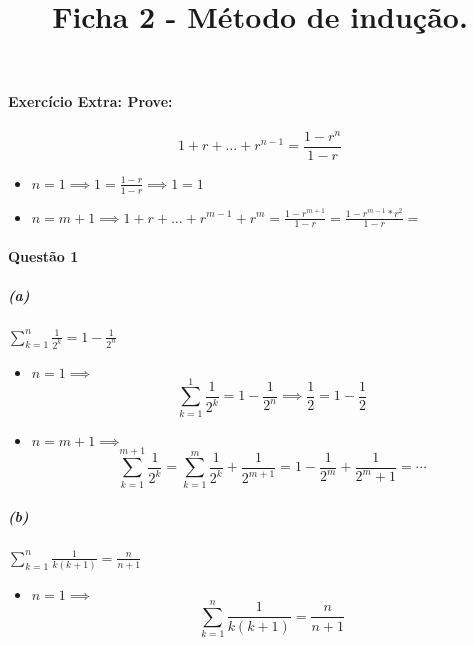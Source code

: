 \documentclass[12pt]{report}
\begin{document}
\title{Ficha 2 - Método de indução.}
\author{}
\date{}

\maketitle

\paragraph{Exercício Extra: Prove: }
$$ 1+r+\dots + r^{n-1}=\frac{1-r^n}{1-r} $$
\begin{itemize}
\item $ n=1\implies 1=\frac{1-r}{1-r} \implies 1=1 $
\item $ n=m+1 \implies 1+r+\dots +r^{m-1}+r^m =\frac{1-r^{m+1}}{1-r}=\frac{1-r^{m-1}*r^2}{1-r}=\frac{}{} $ 
\end{itemize}

\paragraph{Questão 1}
\subparagraph{(a)} $ \sum_{k=1}^{n}{\frac{1}{2^k}} = 1 - \frac{1}{2^n}  $
\begin{itemize}

	\item $ n=1 \implies $	
	$$ \sum_{k=1}^{1}{\frac{1}{2^k}} = 1- \frac{1}{2^n} \implies \frac{1}{2}= 1-\frac{1}{2} $$

	\item $ n=m+1\implies $
	$$ \sum_{k=1}^{m+1}{\frac{1}{2^k}}= \sum_{k=1}^{m}{\frac{1}{2^k}}+\frac{1}{2^{m+1}} = 1-\frac{1}{2^{m}}+\frac{1}{2^m+1}=\cdots $$

\end{itemize}

\subparagraph{(b)} $ \sum_{k=1}^{n}\frac{1}{k(k+1)}=\frac{n}{n+1} $
\begin{itemize}
\item $ n=1 \implies $
$$ \sum_{k=1}^{n}\frac{1}{k(k+1)}=\frac{n}{n+1} $$ 
\end{itemize}
\end{document}
